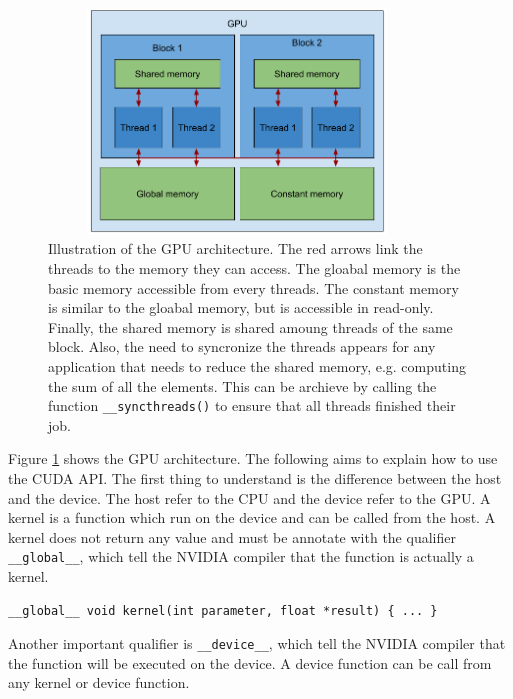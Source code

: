 \documentclass[11pt]{report}
\begin{document}
\begin{figure}[h]
\centering
\includegraphics[width=10cm, height=6cm]{gpu_architecture}
\caption[Illustration of the GPU architecture]{Illustration of the GPU architecture. The red arrows link the threads to the memory they can access. The gloabal memory is the basic memory accessible from every threads. The constant memory is similar to the gloabal memory, but is accessible in read-only. Finally, the shared memory is shared amoung threads of the same block. Also, the need to syncronize the threads appears for any application that needs to reduce the shared memory, e.g. computing the sum of all the elements. This can be archieve by calling the function \texttt{__syncthreads()} to ensure that all threads finished their job.}
\label{fig:gpu_architecture}
\end{figure}

\noindent Figure \ref{fig:gpu_architecture} shows the GPU architecture. The following aims to explain how to use the CUDA API. The first thing to understand is the difference between the host and the device. The host refer to the CPU and the device refer to the GPU. A kernel is a function which run on the device and can be called from the host. A kernel does not return any value and must be annotate with the qualifier \texttt{__global__}, which tell the NVIDIA compiler that the function is actually a kernel.

\begin{verbatim}
__global__ void kernel(int parameter, float *result) { ... }
\end{verbatim}

\noindent Another important qualifier is \texttt{__device__}, which tell the NVIDIA compiler that the function will be executed on the device. A device function can be call from any kernel or device function.
\end{document}
